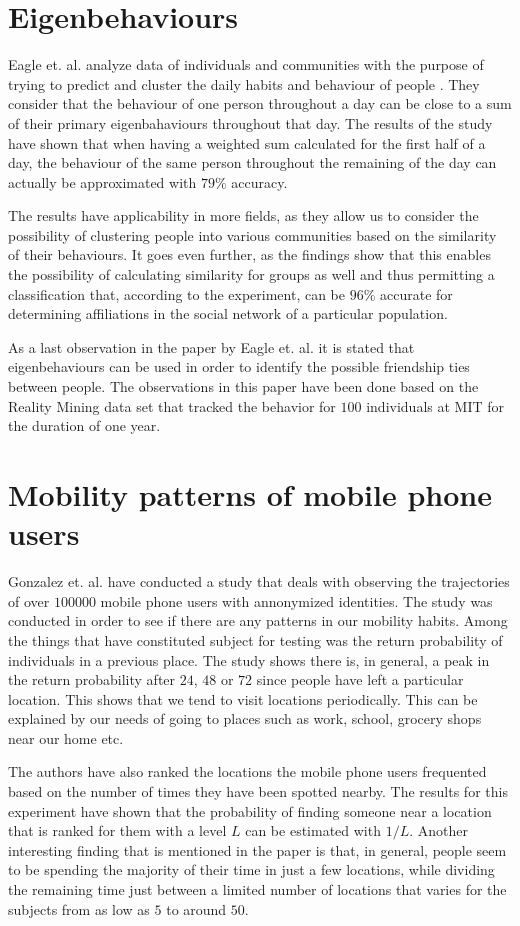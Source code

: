 \section{Eigenbehaviours}
Eagle et. al. analyze data of individuals and communities with the
purpose of trying to predict and cluster the daily habits and behaviour of
people \cite{Eagle09}. They consider that the behaviour of one person throughout
a day can be close to a sum of their primary eigenbahaviours throughout that day.
The results of the study have shown that when having a weighted sum calculated
for the first half of a day, the behaviour of the same person throughout the
remaining of the day can actually be approximated with $79\%$ accuracy.

The results have applicability in more fields, as they allow us to consider the
possibility of clustering people into various communities based on the
similarity of their behaviours. It goes even further, as the findings show that
this enables the possibility of calculating similarity for groups as well and
thus permitting a classification that, according to the experiment, can be
$96\%$ accurate for determining affiliations in the social network of a
particular population.

As a last observation in the paper by Eagle et. al. it is stated that
eigenbehaviours can be used in order to identify the possible friendship ties
between people. The observations in this paper have been done based on the
Reality Mining data set that tracked the behavior for $100$ individuals at MIT
for the duration of one year.

\section{Mobility patterns of mobile phone users}
Gonzalez et. al. have conducted a study \cite{Barabasi08} that deals with
observing the trajectories of over $100000$ mobile phone users with annonymized
identities. The study was conducted in order to see if there are any patterns in
our mobility habits. Among the things that have constituted subject for testing
was the return probability of individuals in a previous place. The study shows
there is, in general, a peak in the return probability after $24$, $48$ or $72$
since people have left a particular location. This shows that we tend to visit
locations periodically. This can be explained by our needs of going to places
such as work, school, grocery shops near our home etc.

The authors have also ranked the locations the mobile phone users frequented
based on the number of times they have been spotted nearby. The results for this
experiment have shown that the probability of finding someone near a location
that is ranked for them with a level $L$ can be estimated with $1/L$. Another
interesting finding that is mentioned in the paper is that, in general, people
seem to be spending the majority of their time in just a few locations, while
dividing the remaining time just between a limited number of locations that
varies for the subjects from as low as $5$ to around $50$.

